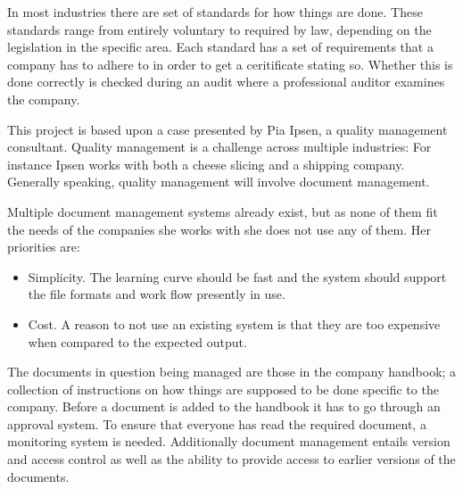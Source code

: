 In most industries there are set of standards for how things are done.
These standards range from  entirely voluntary to required by law, depending on the legislation in the specific area.
Each standard has a set of requirements that a company has to adhere to in order to get a ceritificate stating so.
Whether this is done correctly is checked during an audit where a professional auditor examines the company.

This project is based upon a case presented by Pia Ipsen, a quality management consultant.
Quality management is a challenge across multiple industries: For instance Ipsen works with both a cheese slicing and a shipping company.
Generally speaking, quality management will involve document management.

Multiple document management systems already exist, but as none of them fit the needs of the companies she works with she does not use any of them.
Her priorities are:

\begin{itemize}
\item Simplicity. The learning curve should be fast and the system should support the file formats and work flow presently in use.
\item Cost. A reason to not use an existing system is that they are too expensive when compared to the expected output.
\end{itemize}

The documents in question being managed are those in the company handbook; a collection of instructions on how things are supposed to be done specific to the company.
Before a document is added to the handbook it has to go through an approval system.
To ensure that everyone has read the required document, a monitoring system is needed.
Additionally document management entails version and access control as well as the ability to provide access to earlier versions of the documents.


